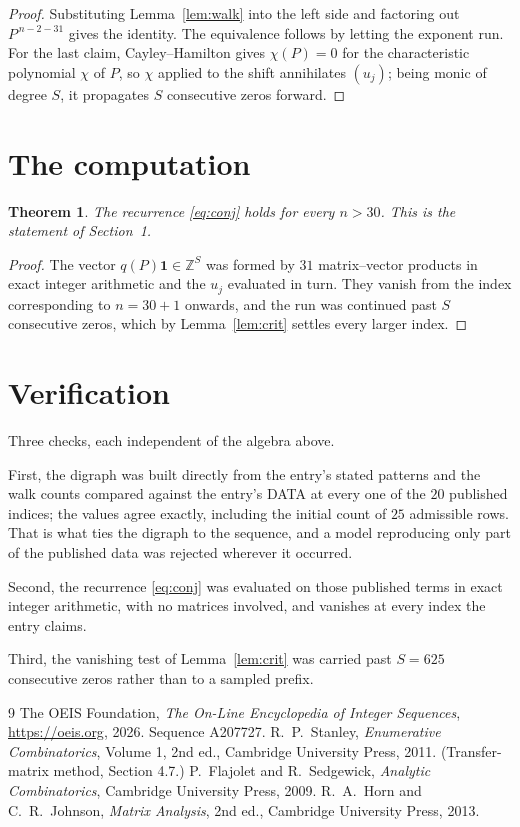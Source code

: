 \documentclass[11pt,a4paper]{article}
\theoremstyle{plain}
\newtheorem{theorem}{Theorem}
\theoremstyle{definition}
\begin{document}
\begin{proof}
Substituting Lemma~\ref{lem:walk} into the left side and factoring out
$P^{\,n-2-31}$ gives the identity. The equivalence follows by letting the exponent
run. For the last claim, Cayley--Hamilton gives $\chi(P)=0$ for the characteristic
polynomial $\chi$ of $P$, so $\chi$ applied to the shift annihilates $(u_j)$; being monic of
degree $S$, it propagates $S$ consecutive zeros forward.
\end{proof}

\section{The computation}

\begin{theorem}
The recurrence \eqref{eq:conj} holds for every $n>30$. This is the statement of
Section~1.
\end{theorem}

\begin{proof}
The vector $q(P)\mathbf{1}\in\mathbb{Z}^{S}$ was formed by $31$ matrix--vector
products in exact integer arithmetic and the $u_j$ evaluated in turn. They vanish from the
index corresponding to $n=30+1$ onwards, and the run was continued past $S$ consecutive
zeros, which by Lemma~\ref{lem:crit} settles every larger index.
\end{proof}

\section{Verification}

Three checks, each independent of the algebra above.

First, the digraph was built directly from the entry's stated patterns and the walk counts
compared against the entry's DATA at every one of the $20$ published indices; the
values agree exactly, including the initial count of $25$ admissible rows. That is
what ties the digraph to the sequence, and a model reproducing only part of the published
data was rejected wherever it occurred.

Second, the recurrence \eqref{eq:conj} was evaluated on those published terms in exact
integer arithmetic, with no matrices involved, and vanishes at every index the entry claims.

Third, the vanishing test of Lemma~\ref{lem:crit} was carried past $S=625$ consecutive
zeros rather than to a sampled prefix.

\begin{thebibliography}{9}
 The OEIS Foundation, \emph{The On-Line Encyclopedia of Integer
Sequences}, \url{https://oeis.org}, 2026. Sequence A207727.
 R.~P.~Stanley, \emph{Enumerative Combinatorics}, Volume 1, 2nd ed.,
Cambridge University Press, 2011. (Transfer-matrix method, Section 4.7.)
 P.~Flajolet and R.~Sedgewick, \emph{Analytic Combinatorics}, Cambridge
University Press, 2009.
 R.~A.~Horn and C.~R.~Johnson, \emph{Matrix Analysis}, 2nd ed., Cambridge
University Press, 2013.
\end{thebibliography}
\end{document}
